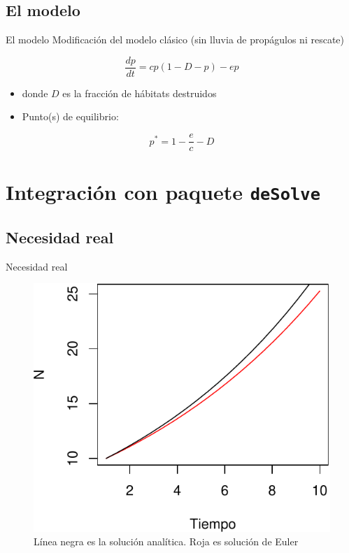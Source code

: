 \documentclass[
  11pt,
  ignorenonframetext,
]{beamer}
\begin{document}
\hypertarget{el-modelo}{%
\subsection{El modelo}\label{el-modelo}}

\begin{frame}{El modelo}
Modificación del modelo clásico (sin lluvia de propágulos ni rescate)

\[\frac{dp}{dt} = cp(1-D-p) - ep\]

\begin{itemize}
\item
  donde \(D\) es la fracción de hábitats destruidos
\item
  Punto(s) de equilibrio:
\end{itemize}

\[p^* = 1 - \frac{e}{c} - D\]
\end{frame}

\hypertarget{integraciuxf3n-con-paquete-desolve}{%
\section{\texorpdfstring{Integración con paquete
\texttt{deSolve}}{Integración con paquete deSolve}}\label{integraciuxf3n-con-paquete-desolve}}

\hypertarget{necesidad-real}{%
\subsection{Necesidad real}\label{necesidad-real}}

\begin{frame}{Necesidad real}
\begin{figure}
\centering
\includegraphics{Modelos-meta_files/figure-beamer/unnamed-chunk-6-1.pdf}
\caption{Línea negra es la solución analítica. Roja es solución de
Euler}
\end{figure}
\end{frame}
\end{document}
